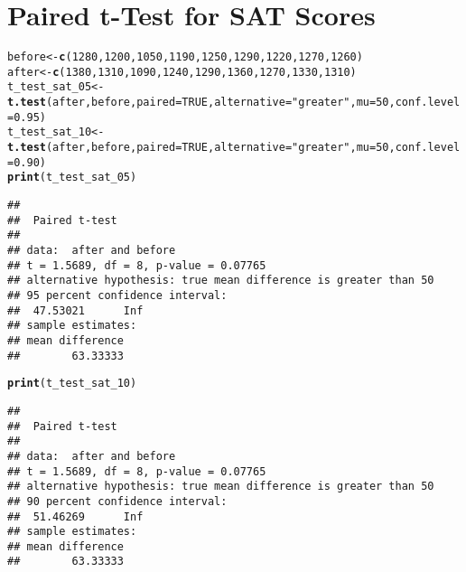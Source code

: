 \documentclass{article}\usepackage[]{graphicx}\usepackage[]{xcolor}
\makeatletter
\newcommand{\hlnum}[1]{\textcolor[rgb]{0.686,0.059,0.569}{#1}}%
\newcommand{\hlsng}[1]{\textcolor[rgb]{0.192,0.494,0.8}{#1}}%
\newcommand{\hldef}[1]{\textcolor[rgb]{0.345,0.345,0.345}{#1}}%
\newcommand{\hlkwb}[1]{\textcolor[rgb]{0.69,0.353,0.396}{#1}}%
\newcommand{\hlkwc}[1]{\textcolor[rgb]{0.333,0.667,0.333}{#1}}%
\newcommand{\hlkwd}[1]{\textcolor[rgb]{0.737,0.353,0.396}{\textbf{#1}}}%
\newenvironment{kframe}{%
 \def\at@end@of@kframe{}%
 \ifinner\ifhmode%
  \def\at@end@of@kframe{\end{minipage}}%
  \begin{minipage}{\columnwidth}%
 \fi\fi%
 \def\FrameCommand##1{\hskip\@totalleftmargin \hskip-\fboxsep
 \colorbox{shadecolor}{##1}\hskip-\fboxsep
     \hskip-\linewidth \hskip-\@totalleftmargin \hskip\columnwidth}%
 \MakeFramed {\advance\hsize-\width
   \@totalleftmargin\z@ \linewidth\hsize
   \@setminipage}}%
 {\par\unskip\endMakeFramed%
 \at@end@of@kframe}
\newenvironment{knitrout}{}{} %
\makeatother
\begin{document}
\section{Paired t-Test for SAT Scores}
\begin{knitrout}
\color{fgcolor}\begin{kframe}
\begin{alltt}
\hldef{before} \hlkwb{<-} \hlkwd{c}\hldef{(}\hlnum{1280}\hldef{,} \hlnum{1200}\hldef{,} \hlnum{1050}\hldef{,} \hlnum{1190}\hldef{,} \hlnum{1250}\hldef{,} \hlnum{1290}\hldef{,} \hlnum{1220}\hldef{,} \hlnum{1270}\hldef{,} \hlnum{1260}\hldef{)}
\hldef{after}  \hlkwb{<-} \hlkwd{c}\hldef{(}\hlnum{1380}\hldef{,} \hlnum{1310}\hldef{,} \hlnum{1090}\hldef{,} \hlnum{1240}\hldef{,} \hlnum{1290}\hldef{,} \hlnum{1360}\hldef{,} \hlnum{1270}\hldef{,} \hlnum{1330}\hldef{,} \hlnum{1310}\hldef{)}
\hldef{t_test_sat_05} \hlkwb{<-} \hlkwd{t.test}\hldef{(after, before,} \hlkwc{paired} \hldef{=} \hlnum{TRUE}\hldef{,} \hlkwc{alternative} \hldef{=} \hlsng{"greater"}\hldef{,} \hlkwc{mu} \hldef{=} \hlnum{50}\hldef{,} \hlkwc{conf.level} \hldef{=} \hlnum{0.95}\hldef{)}
\hldef{t_test_sat_10} \hlkwb{<-} \hlkwd{t.test}\hldef{(after, before,} \hlkwc{paired} \hldef{=} \hlnum{TRUE}\hldef{,} \hlkwc{alternative} \hldef{=} \hlsng{"greater"}\hldef{,} \hlkwc{mu} \hldef{=} \hlnum{50}\hldef{,} \hlkwc{conf.level} \hldef{=} \hlnum{0.90}\hldef{)}
\hlkwd{print}\hldef{(t_test_sat_05)}
\end{alltt}
\begin{verbatim}
## 
## 	Paired t-test
## 
## data:  after and before
## t = 1.5689, df = 8, p-value = 0.07765
## alternative hypothesis: true mean difference is greater than 50
## 95 percent confidence interval:
##  47.53021      Inf
## sample estimates:
## mean difference 
##        63.33333
\end{verbatim}
\begin{alltt}
\hlkwd{print}\hldef{(t_test_sat_10)}
\end{alltt}
\begin{verbatim}
## 
## 	Paired t-test
## 
## data:  after and before
## t = 1.5689, df = 8, p-value = 0.07765
## alternative hypothesis: true mean difference is greater than 50
## 90 percent confidence interval:
##  51.46269      Inf
## sample estimates:
## mean difference 
##        63.33333
\end{verbatim}
\end{kframe}
\end{knitrout}
\end{document}
